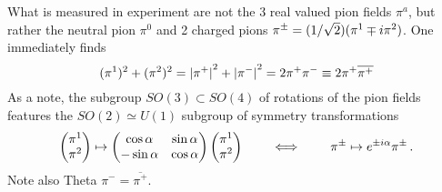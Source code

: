 What is measured in experiment are not the 3 real valued pion fields $\pi^a$, but rather the neutral pion $\pi^0$ and 2 charged pions $\pi^\pm=(1/\sqrt{2})(\pi^1\mp{i}\pi^2)$. One immediately finds 
\begin{equation}
    (\pi^1)^2+(\pi^2)^2={\vert\pi^+\vert}^2+{\vert\pi^-\vert}^2=2\pi^+\pi^-\equiv 2\pi^+\overline{\pi^+}
\end{equation}
As a note, the subgroup ${SO(3)\subset SO(4)}$ of rotations of the pion fields features the ${SO(2)\simeq U(1)}$ subgroup of symmetry transformations
\begin{equation}
    \begin{pmatrix}
        \pi^1\\\pi^2
    \end{pmatrix}
        \mapsto
        \begin{pmatrix}
            \cos\alpha&\sin\alpha\\-\sin\alpha&\cos\alpha
        \end{pmatrix}
        \begin{pmatrix}
            \pi^1\\\pi^2
        \end{pmatrix}
        \qquad\iff\qquad\pi^\pm\mapsto e^{\pm{i}\alpha}\pi^\pm\,.
\end{equation}
Note also Theta $\pi^-=\overline{\pi^+}$.

